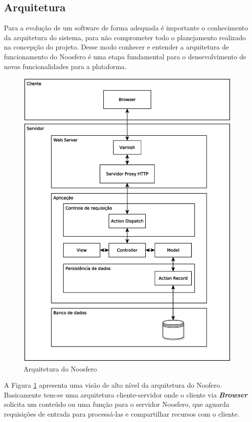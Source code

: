 \subsection{Arquitetura}
\label{arquitetura}

Para a evolução de um software de forma adequada é importante o conhecimento da arquitetura do sistema, para não comprometer todo o planejamento realizado na concepção do projeto. Desse modo conhecer e entender a arquitetura de funcionamento do Noosfero é uma etapa fundamental para o densevolvimento de novas funcionalidades para a plataforma.

\begin{figure}[h]
    \centering
    \includegraphics[keepaspectratio=true,scale=0.4]
      {figuras/DiagramaDeArquitetura.eps}
    \caption{Arquitetura do Noosfero}
    \label{arquitetura-noosfero}
\end{figure}

A Figura \ref{arquitetura-noosfero} apresenta uma visão de alto nível da arquitetura do Noofero. Basicamente tem-se uma arquitetura cliente-servidor onde o cliente via \textbf{\textit{Browser}} solicita um conteúdo ou uma função para o servidor Noosfero, que aguarda requisições de entrada para processá-las e compartilhar recursos com o cliente.

